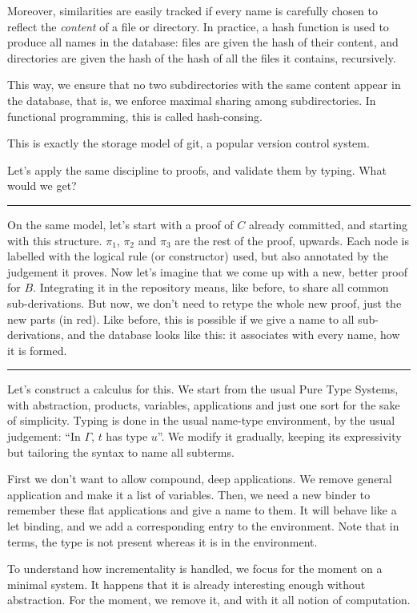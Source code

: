 \documentclass[12pt]{article}
\newcommand{\slide}{\vspace{1em} \hrule \vspace{1em}}
\begin{document}
Moreover, similarities are easily tracked if every name is carefully
chosen to reflect the \emph{content} of a file or directory.  In
practice, a hash function is used to produce all names in the
database: files are given the hash of their content, and directories
are given the hash of the hash of all the files it contains,
recursively.

This way, we ensure that no two subdirectories with the same content
appear in the database, that is, we enforce maximal sharing among
subdirectories. In functional programming, this is called
hash-consing.

This is exactly the storage model of \textsf{git}, a popular version
control system.

Let's apply the same discipline to proofs, and validate them by
typing. What would we get?

\slide

On the same model, let's start with a proof of $C$ already committed,
and starting with this structure. $\pi_1$, $\pi_2$ and $\pi_3$ are the
rest of the proof, upwards. Each node is labelled with the logical
rule (or constructor) used, but also annotated by the judgement it
proves. Now let's imagine that we come up with a new, better proof for
$B$. Integrating it in the repository means, like before, to share all
common sub-derivations. But now, we don't need to retype the whole new
proof, just the new parts (in red). Like before, this is possible if
we give a name to all sub-derivations, and the database looks like
this: it associates with every name, how it is formed.

\slide

Let's construct a calculus for this. We start from the usual Pure Type
Systems, with abstraction, products, variables, applications and just
one sort for the sake of simplicity. Typing is done in the usual
name-type environment, by the usual judgement: ``In $\Gamma$, $t$ has
type $u$''. We modify it gradually, keeping its expressivity but
tailoring the syntax to name all subterms.

First we don't want to allow compound, deep applications. We remove
general application and make it a list of variables. Then, we need a
new binder to remember these flat applications and give a name to
them. It will behave like a \textsf{let} binding, and we add a
corresponding entry to the environment. Note that in terms, the type
is not present whereas it is in the environment.

To understand how incrementality is handled, we focus for the moment
on a minimal system. It happens that it is already interesting enough
without abstraction. For the moment, we remove it, and with it all
notion of computation.
\end{document}
